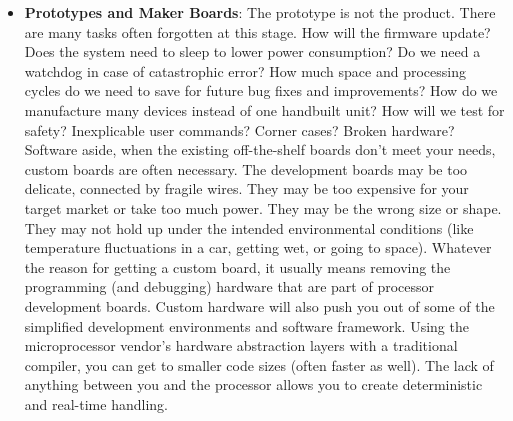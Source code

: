 \documentclass{report}
\begin{document}
\begin{itemize}
            Once development and testing are finished, the system is manufactured, which is something most pure software engineers never need to consider. However, creating a system that can be manufactured for a reasonable cost is a goal that both embedded software engineers and hardware engineers have to keep in mind. Supporting manufacturing is one way you can make sure that the system that you created gets reproduced with high fidelity.
            \bigbreak \noindent 
            After manufacture, the units go into the field. With consumer products, that means they go into millions of homes where any bugs you created are enjoyed by many. With medical, aviation, or other critical products, your bugs may be catastrophic (which is why you get to do so much paperwork). With scientific or monitoring equipment, the field could be a place where the unit cannot ever be retrieved (or retrieved only at great risk and expense; consider the devices in volcano calderas), so it had better work. The life your system is going to lead after it leaves you is something you must consider as you design the software.
        \item \textbf{Prototypes and Maker Boards}: The prototype is not the product. There are many tasks often forgotten at this stage. How will the firmware update? Does the system need to sleep to lower power consumption? Do we need a watchdog in case of catastrophic error? How much space and processing cycles do we need to save for future bug fixes and improvements? How do we manufacture many devices instead of one handbuilt unit? How will we test for safety? Inexplicable user commands? Corner cases? Broken hardware?
            \bigbreak \noindent 
            Software aside, when the existing off-the-shelf boards don’t meet your needs, custom boards are often necessary. The development boards may be too delicate, connected by fragile wires. They may be too expensive for your target market or take too much power. They may be the wrong size or shape. They may not hold up under the intended environmental conditions (like temperature fluctuations in a car, getting wet, or going to space).
            \bigbreak \noindent 
            Whatever the reason for getting a custom board, it usually means removing the programming (and debugging) hardware that are part of processor development boards.
            \bigbreak \noindent 
            Custom hardware will also push you out of some of the simplified development environments and software framework. Using the microprocessor vendor’s hardware abstraction layers with a traditional compiler, you can get to smaller code sizes (often faster as well). The lack of anything between you and the processor allows you to create deterministic and real-time handling.

\end{itemize}
\end{document}
